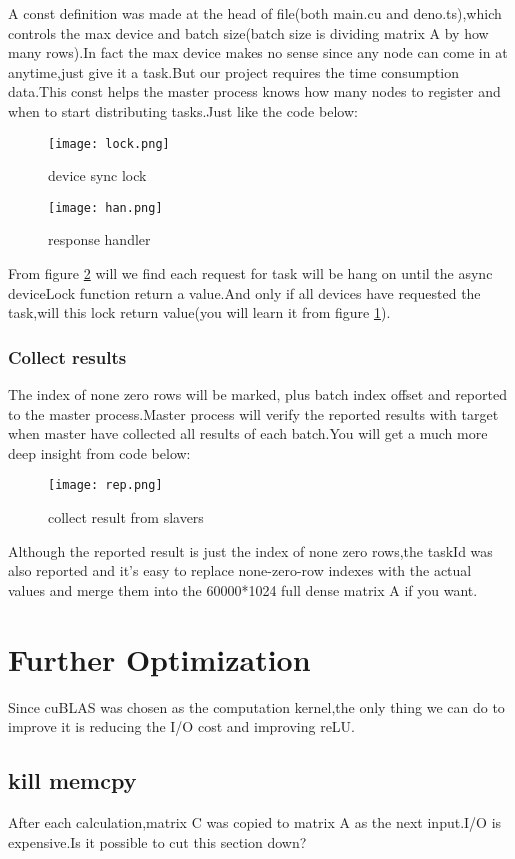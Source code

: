 \documentclass[12pt]{scrartcl} %
\begin{document}
A const definition was made at the head of file(both main.cu and deno.ts),which controls the max device and batch size(batch size is dividing matrix A by how many rows).In fact the max device makes no sense since any node can come in at anytime,just give it a task.But our project requires the time consumption data.This const helps the master process knows how many nodes to register and when to start distributing tasks.Just like the code below:
\begin{figure}[H]
    \centering
    \texttt{[image: lock.png]}
    \caption{device sync lock}
    \label{dd}
\end{figure}
\begin{figure}[H]
    \centering
    \texttt{[image: han.png]}
    \caption{response handler}
    \label{rr}
\end{figure}
From figure \ref{rr} will we find each request for task will be hang on until the async deviceLock function return a value.And only if all devices have requested the task,will this lock return value(you will learn it from figure \ref{dd}).
\subsubsection{Collect results}
The index of none zero rows will be marked, plus batch index offset and reported to the master process.Master process will verify the reported results with target when master have collected all results of each batch.You will get a much more deep insight from code below:
\begin{figure}[H]
    \centering
    \texttt{[image: rep.png]}
    \caption{collect result from slavers}
    \label{}
\end{figure}

Although the reported result is just the index of none zero rows,the taskId was also reported and it's easy to replace none-zero-row indexes with the actual values and merge them into the 60000*1024 full dense matrix A if you want.
\section{Further Optimization}
Since cuBLAS was chosen as the computation kernel,the only thing we can do to improve it is reducing the I/O cost and improving reLU.
\subsection{kill memcpy}
After each calculation,matrix C was copied to matrix A as the next input.I/O is expensive.Is it possible to cut this section down?
\end{document}
